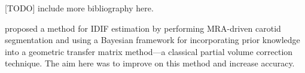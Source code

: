 	[TODO] include more bibliography here.


\citeauthor{irace2021bayesian} \cite{irace2021bayesian} proposed a method for IDIF estimation by performing MRA-driven carotid segmentation and using a Bayesian framework for incorporating prior knowledge into a geometric transfer matrix method—a classical partial volume correction technique.
The aim here was to improve on this method and increase accuracy.
